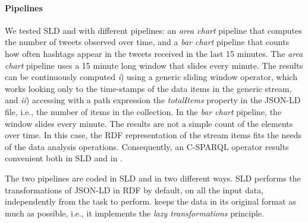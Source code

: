\paragraph{Pipelines}
We tested SLD and \sti{} with different pipelines: an \textit{area chart} pipeline that computes the number of tweets observed over time, and a \textit{bar chart} pipeline that counts how often hashtags appear in the tweets received in the last 15 minutes.
The \textit{area chart} pipeline uses a 15 minute long window that slides every minute. The results can be continuously computed \textit{i}) using a generic sliding window operator, which works looking only to the time-stamps of the data items in the generic stream, and \textit{ii}) accessing with a path expression the \textit{totalItems} property in the JSON-LD file, i.e., the number of items in the collection.
In the \textit{bar chart} pipeline, the window slides every minute. The results are not a simple count of the elements over time. In this case, the RDF representation of the stream items fits the needs of the data analysis operations. Consequently, an C-SPARQL operator results convenient both in SLD and in \sti{}.


The two pipelines are coded in SLD and \sti{} in two different ways. SLD performs the transformations of JSON-LD in RDF by default, on all the input data, independently from the task to perform. \sti{} keeps the data in its original format as much as possible, i.e., it implements the \textit{lazy transformations} principle.

